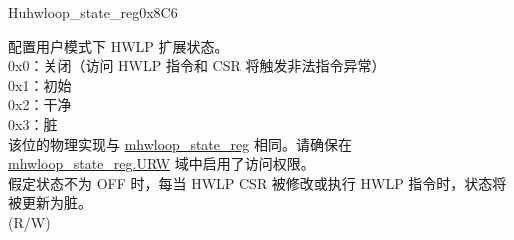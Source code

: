\begin{register}{H}{uhwloop\_state\_reg}{0x8C6}\label{regdesc:uhwlp_state_reg}
%
%
\regnewline%
\begin{regdesc}\begin{reglist}
\label{fielddesc:UHWSTATE}\item [STATE] 配置用户模式下 HWLP 扩展状态。\\
0x0：关闭（访问 HWLP 指令和 CSR 将触发非法指令异常）\\
0x1：初始\\
0x2：干净\\
0x3：脏\\
该位的物理实现与 \hyperref[regdesc:mhwlp_state_reg]{mhwloop\_state\_reg} 相同。请确保在 \hyperref[fielddesc:HWSTATE]{mhwloop\_state\_reg.URW} 域中启用了访问权限。\\
假定状态不为 OFF 时，每当 HWLP CSR 被修改或执行 HWLP 指令时，状态将被更新为脏。\\
(R/W)
\end{reglist}\end{regdesc}
\end{register}
